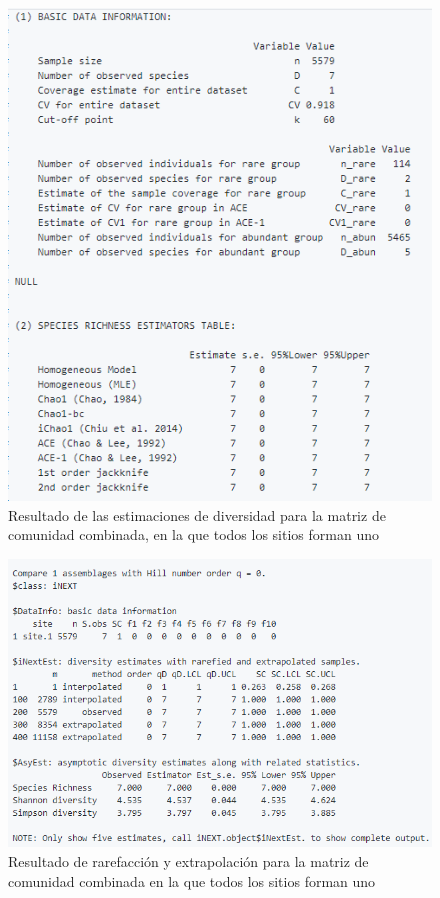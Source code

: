 \documentclass[11pt,]{article}
\begin{document}
\begin{figure}
\centering
\includegraphics{chao_asintotico.png}
\caption{Resultado de las estimaciones de diversidad para la matriz de
comunidad combinada, en la que todos los sitios forman uno
\label{fig:chao_asintotico}}
\end{figure}

\begin{figure}
\centering
\includegraphics{chao_noasintotico.png}
\caption{Resultado de rarefacción y extrapolación para la matriz de
comunidad combinada en la que todos los sitios forman uno
\label{fig:chao_noasintotico}}
\end{figure}
\end{document}
